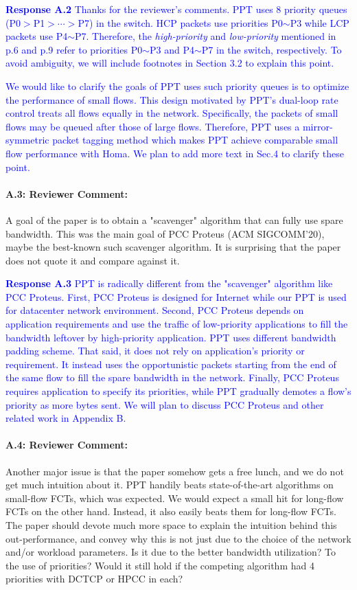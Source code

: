 \documentclass[12pt,one-column]{article}
\begin{document}
\noindent\textcolor{blue}{\textbf{Response A.2}
Thanks for the reviewer's comments. 
PPT uses 8 priority queues (P0$>$P1$>\cdots>$P7) in the switch.
HCP packets use priorities P0$\sim$P3 while LCP packets use P4$\sim$P7.
Therefore, the \emph{high-priority} and \emph{low-priority} mentioned in p.6 and p.9 refer to priorities P0$\sim$P3 and P4$\sim$P7 in the switch, respectively.
To avoid ambiguity, we will include footnotes in Section 3.2 to explain this point.
} 

\textcolor{blue}{We would like to clarify the goals of PPT uses such priority queues is to optimize the performance of small flows. This design motivated by PPT's dual-loop rate control treats all flows equally in the network. Specifically, the packets of small flows may be queued after those of large flows. Therefore, PPT uses a mirror-symmetric packet tagging method which makes PPT achieve comparable small flow performance with Homa. We plan to add more text in Sec.4 to clarify these point.
}

{\it \paragraph{A.3: Reviewer Comment:} A goal of the paper is to obtain a "scavenger" algorithm that can fully use spare bandwidth. This was the main goal of PCC Proteus (ACM SIGCOMM'20), maybe the best-known such scavenger algorithm. It is surprising that the paper does not quote it and compare against it.}

\noindent\textcolor{blue}{\textbf{Response A.3}
PPT is radically different from the "scavenger" algorithm like PCC Proteus.
First, PCC Proteus is designed for Internet while our PPT is used for datacenter network environment.
Second, PCC Proteus depends on application requirements and use the traffic of low-priority applications to fill the bandwidth leftover by high-priority application. PPT uses different bandwidth padding scheme. That said, it does not rely on application's priority or requirement. It instead uses the opportunistic packets starting from the end of the same flow to fill the spare bandwidth in the network.
Finally, PCC Proteus requires application to specify its priorities, while PPT gradually demotes a flow's priority as more bytes sent. We will plan to discuss PCC Proteus and other related work in Appendix B.
} 

{\it \paragraph{A.4: Reviewer Comment:}Another major issue is that the paper somehow gets a free lunch, and we do not get much intuition about it. PPT handily beats state-of-the-art algorithms on small-flow FCTs, which was expected. We would expect a small hit for long-flow FCTs on the other hand. Instead, it also easily beats them for long-flow FCTs. The paper should devote much more space to explain the intuition behind this out-performance, and convey why this is not just due to the choice of the network and/or workload parameters. Is it due to the better bandwidth utilization? To the use of priorities? Would it still hold if the competing algorithm had 4 priorities with DCTCP or HPCC in each?}
\end{document}
